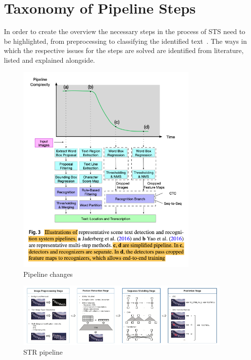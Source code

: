 \section{Taxonomy of Pipeline Steps}
In order to create the overview the necessary steps in the process of \ac{STS} need to be highlighted,
from preprocessing to classifying the identified text~\citep{long_scene_2021, sourvanos_challenges_2018}.
The ways in which the respective issues for the steps are solved are identified from literature,
listed and explained alongside.

\begin{figure}[h]
    \centering
    \includegraphics[width=0.80\textwidth]{img/Long-Scene-2021-Pipeline-Changes.png}
    \caption{Pipeline changes~\citep{long_scene_2021}\label{fig:piplineChanges}}
\end{figure}

\begin{figure}[h]
    \centering
    \includegraphics[width=0.95\textwidth]{img/Chen-Text-2021-STR-Pipeline.png}
    \caption{STR pipeline~\citep{chen_text_2021}\label{fig:STR-pipeline}}
\end{figure}

